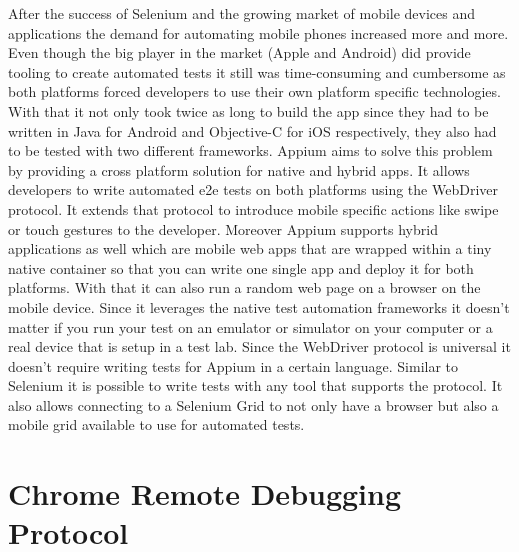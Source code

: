 After the success of Selenium and the growing market of mobile devices and applications the demand for automating mobile phones increased more and more. Even though the big player in the market (Apple and Android) did provide tooling to create automated tests it still was time-consuming and cumbersome as both platforms forced developers to use their own platform specific technologies. With that it not only took twice as long to build the app since they had to be written in Java for Android and Objective-C for iOS respectively, they also had to be tested with two different frameworks. Appium aims to solve this problem by providing a cross platform solution for native and hybrid apps. It allows developers to write automated e2e tests on both platforms using the WebDriver protocol. It extends that protocol to introduce mobile specific actions like swipe or touch gestures to the developer. Moreover Appium supports hybrid applications as well which are mobile web apps that are wrapped within a tiny native container so that you can write one single app and deploy it for both platforms. With that it can also run a random web page on a browser on the mobile device. Since it leverages the native test automation frameworks it doesn't matter if you run your test on an emulator or simulator on your computer or a real device that is setup in a test lab. Since the WebDriver protocol is universal it doesn't require writing tests for Appium in a certain language. Similar to Selenium it is possible to write tests with any tool that supports the protocol. It also allows connecting to a Selenium Grid to not only have a browser but also a mobile grid available to use for automated tests.

\section{Chrome Remote Debugging Protocol\label{sec:remotedebuggingprotocol}}

